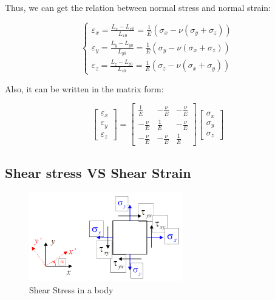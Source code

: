 \documentclass[en,hazy,cyan,8pt,normal]{elegantnote}
\numberwithin{equation}{section}
\begin{document}
    Thus, we can get the relation between normal stress and normal strain:

    \begin{equation}\label{eq:059}
      \left\{
      \begin{aligned}
        \varepsilon_x = \frac{L_x - L_{x0}}{L_{x0}} = \frac{1}{E}\left(\sigma_x - \nu(\sigma_y + \sigma_z)\right) \\
        \varepsilon_y = \frac{L_y - L_{y0}}{L_{y0}} = \frac{1}{E}\left(\sigma_y - \nu(\sigma_x + \sigma_z)\right) \\
        \varepsilon_z = \frac{L_z - L_{z0}}{L_{z0}} = \frac{1}{E}\left(\sigma_z - \nu(\sigma_x + \sigma_y)\right)
      \end{aligned}
      \right.
    \end{equation}

    Also, it can be written in the matrix form:

    \begin{equation}\label{eq:060}
      \begin{bmatrix}
        \varepsilon_x \\
        \varepsilon_y \\
        \varepsilon_z
      \end{bmatrix}
      =
      \begin{bmatrix}
        \frac{1}{E} & -\frac{\nu}{E} & -\frac{\nu}{E} \\
        -\frac{\nu}{E} & \frac{1}{E} & -\frac{\nu}{E} \\
        -\frac{\nu}{E} & -\frac{\nu}{E} & \frac{1}{E}
      \end{bmatrix}
      \begin{bmatrix}
        \sigma_x \\
        \sigma_y \\
        \sigma_z
      \end{bmatrix}
    \end{equation}

  \subsection{Shear stress VS Shear Strain}\label{subsec:03.04}
    
    \begin{figure}[H]
      \centering
      \includegraphics[width=0.6\textwidth]{image/017.png}
      \caption{Shear Stress in a body}
      \label{fig:017}
    \end{figure}
\end{document}
